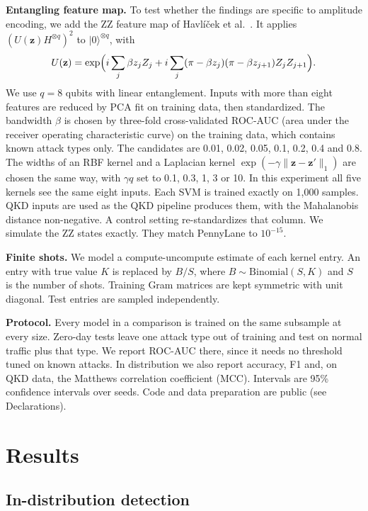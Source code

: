 \documentclass[pdflatex,sn-mathphys-num,lineno]{sn-jnl}
\theoremstyle{thmstyleone}
\begin{document}
\textbf{Entangling feature map.} To test whether the findings are specific to
amplitude encoding, we add the ZZ feature map of Havl\'i\v{c}ek et
al.~\cite{havlicek2019supervised}. It applies $(U(\mathbf{z})H^{\otimes q})^2$ to
$|0\rangle^{\otimes q}$, with
\begin{equation}
U(\mathbf{z})=\exp\Bigl(i\sum_{j} \beta z_j Z_j
+ i\sum_{j} (\pi-\beta z_j)(\pi-\beta z_{j+1}) Z_jZ_{j+1}\Bigr).
\end{equation}
We use $q=8$ qubits with linear entanglement. Inputs with more than eight features
are reduced by PCA fit on training data, then standardized. The bandwidth $\beta$
is chosen by three-fold cross-validated ROC-AUC (area under the receiver operating
characteristic curve) on the training data, which contains
known attack types only. The candidates are 0.01, 0.02, 0.05, 0.1, 0.2, 0.4 and
0.8. The widths of an
RBF kernel and a Laplacian kernel $\exp(-\gamma\|\mathbf{z}-\mathbf{z}'\|_1)$ are
chosen the same way, with $\gamma q$ set to 0.1, 0.3, 1, 3 or 10. In this experiment all
five kernels see the same eight inputs. Each SVM is trained exactly on 1,000
samples. QKD inputs are used as the QKD pipeline produces them, with the
Mahalanobis distance non-negative. A control setting re-standardizes that column. We simulate the ZZ states exactly. They match
PennyLane to $10^{-15}$.

\textbf{Finite shots.} We model a compute-uncompute estimate of each kernel entry.
An entry with true value $K$ is replaced by $B/S$, where $B\sim\mathrm{Binomial}(S,K)$
and $S$ is the number of shots. Training Gram matrices are kept symmetric with unit
diagonal. Test entries are sampled independently.

\textbf{Protocol.} Every model in a comparison is trained on the same subsample at
every size. Zero-day tests leave one attack type out of training and test on
normal traffic plus that type. We report ROC-AUC there, since it needs no threshold
tuned on known attacks. In distribution we also report accuracy, F1 and, on QKD
data, the Matthews correlation coefficient (MCC). Intervals are 95\% confidence intervals over seeds. Code
and data preparation are public (see Declarations).

\section{Results}
\label{sec:results}

\subsection{In-distribution detection}
\end{document}
